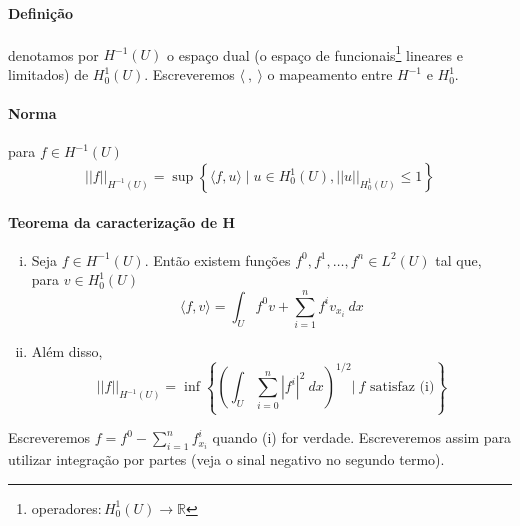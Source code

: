 \documentclass[a4paper, 11pt]{book}
\newcommand{\R}{\mathbb{R}}
\begin{document}
\paragraph{Definição} denotamos por $H^{-1}(U)$  o espaço dual (o espaço de funcionais\footnote{operadores$:H^1_0(U)\rightarrow\R$} lineares e limitados) de $H^1_0(U)$. Escreveremos $\langle \ , \ \rangle$ o mapeamento entre $H^{-1}$ e $H^1_0$.

\paragraph{Norma} para $f \in H^{-1}(U)$\[
||f||_{H^{-1}(U)} = \sup \left\{ \langle f, u \rangle \mid u \in H^1_0(U), ||u||_{H^1_0(U)} \leq 1 \right\}
\]

\paragraph{Teorema da caracterização de H}
\begin{enumerate}[(i)]
	\item Seja $f \in H^{-1}(U)$. Então existem funções $f^0, f^1, \ldots, f^n \in L^2(U)$ tal que, para $v \in H^1_0(U)$ \begin{equation}
	\langle f, v \rangle = \int_U f^0 v + \sum_{i=1}^{n}f^i v_{x_i}\ dx
	\end{equation}

	\item Além disso, \[
	||f||_{H^{-1}(U)} = \inf \left\{ \left( \int_U \sum_{i=0}^{n}|f^i|^2\ dx \right)^{1/2} \Big|\  f \text{ satisfaz (i)} \right\} 	
	\]
\end{enumerate}

Escreveremos $f=f^0 - \sum_{i=1}^{n} f^i_{x_i}$ quando (i) for verdade. Escreveremos assim para utilizar integração por partes (veja o sinal negativo no segundo termo).
\end{document}
